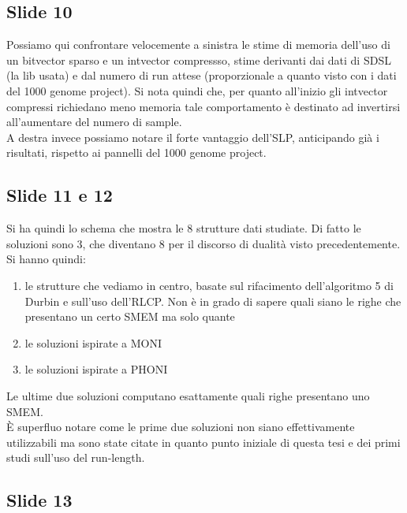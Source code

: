 \documentclass[a4paper,11pt, oneside,italian]{article}
\begin{document}
\subsection*{Slide 10}
Possiamo qui confrontare velocemente a sinistra le stime di memoria dell'uso di
un bitvector sparso e un intvector compressso, stime derivanti dai dati di SDSL
(la lib usata) e dal numero di run attese (proporzionale a quanto visto con i
dati del 1000 genome project). Si nota quindi che, per quanto all'inizio gli
intvector compressi richiedano meno memoria tale comportamento è destinato ad
invertirsi all'aumentare del numero di sample.\\
A destra invece possiamo notare il forte vantaggio dell'SLP, anticipando già i
risultati, rispetto ai pannelli del 1000 genome project.
\subsection*{Slide 11 e 12}
Si ha quindi lo schema che mostra le 8 strutture dati studiate. Di fatto le
soluzioni sono 3, che diventano 8 per il discorso di dualità visto
precedentemente.
Si hanno quindi:
\begin{enumerate}
  \item le strutture che vediamo in centro, basate sul rifacimento
  dell'algoritmo 5 di Durbin e sull'uso dell'RLCP. Non è in grado di sapere
  quali siano le righe che presentano un certo SMEM ma solo quante
  \item le soluzioni ispirate a MONI
  \item le soluzioni ispirate a PHONI
\end{enumerate}
Le ultime due soluzioni computano esattamente quali righe presentano uno SMEM.\\
È superfluo notare come le prime due soluzioni non siano effettivamente
utilizzabili ma sono state citate in quanto punto iniziale di questa tesi e dei
primi studi sull'uso del run-length.
\subsection*{Slide 13}
\end{document}
